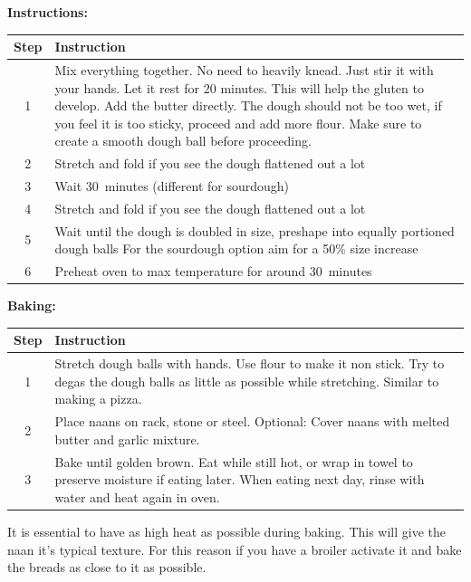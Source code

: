 \noindent\textbf{Instructions:}
\begin{center}
\begin{tabular}{|c|p{12cm}|}
    \hline
    \textbf{Step} & \textbf{Instruction} \\
    \hline
    1 & Mix everything together. No need to heavily knead. Just stir it with
    your hands. Let it rest for 20 minutes. This will help the gluten to
    develop. Add the butter directly. The dough should not be too wet,
    if you feel it is too sticky, proceed and add more flour. Make sure
    to create a smooth dough ball before proceeding. \\
    \hline
    2 & Stretch and fold if you see the dough flattened out a lot \\
    \hline
    3 & Wait 30~minutes (different for sourdough) \\
    \hline
    4 & Stretch and fold if you see the dough flattened out a lot \\
    \hline
    5 & Wait until the dough is doubled in size, preshape into equally portioned
    dough balls For the sourdough option aim for a 50\% size increase \\
    \hline
    6 & Preheat oven to max temperature for around 30~minutes \\
    \hline
\end{tabular}
\end{center}

\noindent\textbf{Baking:}
\begin{center}
\begin{tabular}{|c|p{12cm}|}
    \hline
    \textbf{Step} & \textbf{Instruction} \\
    \hline
    1 & Stretch dough balls with hands. Use flour to make it non stick. Try to
    degas the dough balls as little as possible while stretching. Similar to
    making a pizza. \\
    \hline
    2 & Place naans on rack, stone or steel. Optional: Cover naans with melted
    butter and garlic mixture. \\
    \hline
    3 & Bake until golden brown. Eat while still hot, or wrap in towel to
    preserve moisture if eating later. When eating next day, rinse with water
    and heat again in oven. \\
    \hline
\end{tabular}
\end{center}

It is essential to have as high heat as possible during baking. This will give
the naan it's typical texture. For this reason if you have a broiler activate
it and bake the breads as close to it as possible.

